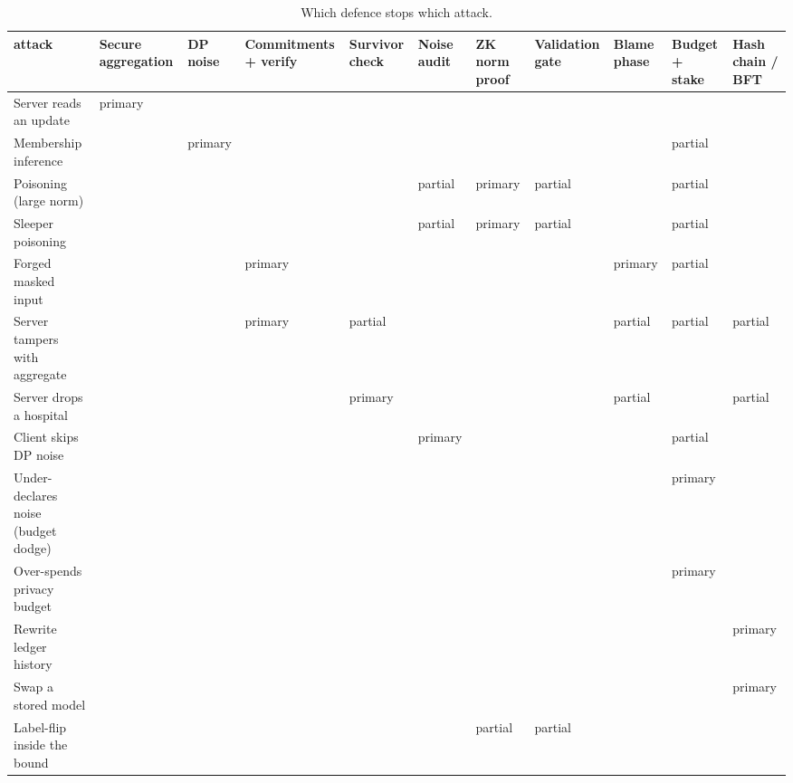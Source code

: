 \begin{table}
\caption{Which defence stops which attack.}
\label{tab:T20_defence_coverage}
\begin{tabular}{lllllllllll}
\toprule
attack & Secure aggregation & DP noise & Commitments + verify & Survivor check & Noise audit & ZK norm proof & Validation gate & Blame phase & Budget + stake & Hash chain / BFT \\
\midrule
Server reads an update & primary &  &  &  &  &  &  &  &  &  \\
Membership inference &  & primary &  &  &  &  &  &  & partial &  \\
Poisoning (large norm) &  &  &  &  & partial & primary & partial &  & partial &  \\
Sleeper poisoning &  &  &  &  & partial & primary & partial &  & partial &  \\
Forged masked input &  &  & primary &  &  &  &  & primary & partial &  \\
Server tampers with aggregate &  &  & primary & partial &  &  &  & partial & partial & partial \\
Server drops a hospital &  &  &  & primary &  &  &  & partial &  & partial \\
Client skips DP noise &  &  &  &  & primary &  &  &  & partial &  \\
Under-declares noise (budget dodge) &  &  &  &  &  &  &  &  & primary &  \\
Over-spends privacy budget &  &  &  &  &  &  &  &  & primary &  \\
Rewrite ledger history &  &  &  &  &  &  &  &  &  & primary \\
Swap a stored model &  &  &  &  &  &  &  &  &  & primary \\
Label-flip inside the bound &  &  &  &  &  & partial & partial &  &  &  \\
\bottomrule
\end{tabular}
\end{table}

